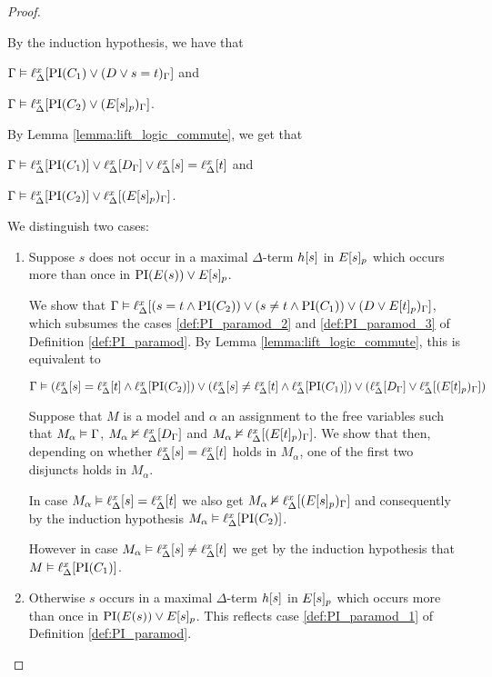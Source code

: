 \begin{proof}
\begin{indproof}
			By the induction hypothesis, we have that 

			$\Gamma \entails \lif{\PI(C_1) \lor (D \lor s=t)_\Gamma}$ and 

			$\Gamma \entails \lif{\PI(C_2) \lor (E\occurat{s}{p})_\Gamma}$.

			By Lemma \ref{lemma:lift_logic_commute}, we get that 

			$\Gamma \entails \lif{\PI(C_1)} \lor \lif{D_\Gamma} \lor \lif{s}=\lif{t}$ and 

			$\Gamma \entails \lif{\PI(C_2)} \lor \lif{(E\occurat{s}{p})_\Gamma}$.

			We distinguish two cases:\nopagebreak
			\begin{enumerate}
				\item Suppose $s$ does not occur in a maximal $\Delta$-term $h\occur{s}$ in $E\occurat{s}{p}$ which occurs more than once in $\PI(E(s)) \lor E\occurat{s}{p}$.

					We show that $\Gamma \entails \lif{ (s=t \land \PI(C_2)) \lor (s\neq t \land \PI(C_1)) \lor (D \lor E\occurat{t}{p})_\Gamma}$, which subsumes the cases \ref{def:PI_paramod_2} and \ref{def:PI_paramod_3} of 
					Definition \ref{def:PI_paramod}. By Lemma \ref{lemma:lift_logic_commute}, this is equivalent to

					$\Gamma \entails (\lif{s}=\lif{t} \land \lif{\PI(C_2)}) \lor (\lif s\neq \lif t \land \lif{\PI(C_1)}) \lor (\lif{D_\Gamma} \lor \lif{(E\occurat{t}{p})_\Gamma})$

					Suppose that $M$ is a model and $\alpha$ an assignment to the free variables 
					such that $M_\alpha \entails \Gamma$,
					$M_\alpha \notentails \lift{\Delta}{ D_\Gamma }{x}$ and 
					$M_\alpha \notentails \lift{\Delta}{ (E\occurat{t}{p})_\Gamma }{x}$.
					We show that then, depending on whether $\lif{s} = \lif{t}$ holds in $M_\alpha$, one of the first two disjuncts holds in $M_\alpha$.

					In case $M_\alpha \entails \lif{s} = \lif{t}$ we also get
					$M_\alpha \notentails \lift{\Delta}{ (E\occurat{s}{p})_\Gamma }{x}$ and consequently by the induction hypothesis $M_\alpha\entails \lif{\PI(C_2)}$.

					However in case $M_\alpha \entails \lif{s} \neq \lif{t}$ we get by the induction hypothesis that 
					$M\entails \lif{\PI(C_1)}$.

					\label{njktahjtkhltah}

				\item Otherwise $s$ occurs in a maximal $\Delta$-term $h\occur{s}$ in $E\occurat{s}{p}$ which occurs more than once in $\PI(E(s)) \lor E\occurat{s}{p}$.
				This reflects case \ref{def:PI_paramod_1} of Definition \ref{def:PI_paramod}.


\end{enumerate}
\end{indproof}
\end{proof}
